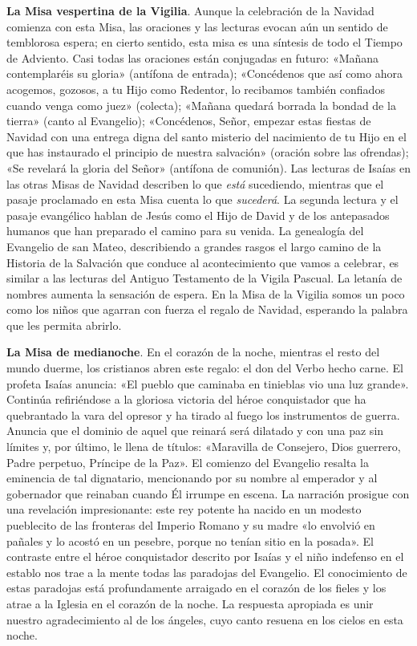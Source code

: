 \documentclass[]{article}
\begin{document}
\textbf{La Misa vespertina de la Vigilia}. Aunque la celebración de la
Navidad comienza con esta Misa, las oraciones y las lecturas evocan aún
un sentido de temblorosa espera; en cierto sentido, esta misa es una
síntesis de todo el Tiempo de Adviento. Casi todas las oraciones están
conjugadas en futuro: «Mañana contemplaréis su gloria» (antífona de
entrada); «Concédenos que así como ahora acogemos, gozosos, a tu Hijo
como Redentor, lo recibamos también confiados cuando venga como juez»
(colecta); «Mañana quedará borrada la bondad de la tierra» (canto al
Evangelio); «Concédenos, Señor, empezar estas fiestas de Navidad con una
entrega digna del santo misterio del nacimiento de tu Hijo en el que has
instaurado el principio de nuestra salvación» (oración sobre las
ofrendas); «Se revelará la gloria del Señor» (antífona de comunión). Las
lecturas de Isaías en las otras Misas de Navidad describen lo que
\emph{está} sucediendo, mientras que el pasaje proclamado en esta Misa
cuenta lo que \emph{sucederá}. La segunda lectura y el pasaje evangélico
hablan de Jesús como el Hijo de David y de los antepasados humanos que
han preparado el camino para su venida. La genealogía del Evangelio de
san Mateo, describiendo a grandes rasgos el largo camino de la Historia
de la Salvación que conduce al acontecimiento que vamos a celebrar, es
similar a las lecturas del Antiguo Testamento de la Vigila Pascual. La
letanía de nombres aumenta la sensación de espera. En la Misa de la
Vigilia somos un poco como los niños que agarran con fuerza el regalo de
Navidad, esperando la palabra que les permita abrirlo.

\textbf{La Misa de medianoche}. En el corazón de la noche, mientras el
resto del mundo duerme, los cristianos abren este regalo: el don del
Verbo hecho carne. El profeta Isaías anuncia: «El pueblo que caminaba en
tinieblas vio una luz grande». Continúa refiriéndose a la gloriosa
victoria del héroe conquistador que ha quebrantado la vara del opresor y
ha tirado al fuego los instrumentos de guerra. Anuncia que el dominio de
aquel que reinará será dilatado y con una paz sin límites y, por último,
le llena de títulos: «Maravilla de Consejero, Dios guerrero, Padre
perpetuo, Príncipe de la Paz». El comienzo del Evangelio resalta la
eminencia de tal dignatario, mencionando por su nombre al emperador y al
gobernador que reinaban cuando Él irrumpe en escena. La narración
prosigue con una revelación impresionante: este rey potente ha nacido en
un modesto pueblecito de las fronteras del Imperio Romano y su madre «lo
envolvió en pañales y lo acostó en un pesebre, porque no tenían sitio en
la posada». El contraste entre el héroe conquistador descrito por Isaías
y el niño indefenso en el establo nos trae a la mente todas las
paradojas del Evangelio. El conocimiento de estas paradojas está
profundamente arraigado en el corazón de los fieles y los atrae a la
Iglesia en el corazón de la noche. La respuesta apropiada es unir
nuestro agradecimiento al de los ángeles, cuyo canto resuena en los
cielos en esta noche.
\end{document}
